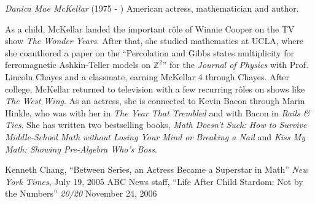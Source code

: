 \documentclass[12pt]{article}
\begin{document}

\emph{Danica Mae McKellar} (1975 - ) American actress, mathematician and author.

As a child, McKellar landed the important r\^ole of Winnie Cooper on the TV show {\it The Wonder Years}. After that, she studied mathematics at UCLA, where she coauthored a paper on the ``Percolation and Gibbs states multiplicity for ferromagnetic Ashkin-Teller models on $\mathbb{Z}^2$'' for the {\it Journal of Physics} with Prof. Lincoln Chayes and a classmate, earning McKellar  4 through Chayes. After college, McKellar returned to television with a few recurring r\^oles on shows like {\it The West Wing}. As an actress, she is connected to Kevin Bacon through Marin Hinkle, who was with her in {\it The Year That Trembled} and with Bacon in {\it Rails \& Ties}. She has written two bestselling books, {\it Math Doesn't Suck: How to Survive Middle-School Math without Losing Your Mind or Breaking a Nail} and {\it Kiss My Math: Showing Pre-Algebra Who's Boss}.

\begin{thebibliography}{2}
 Kenneth Chang, ``Between Series, an Actress Became a Superstar in Math'' {\it New York Times}, July 19, 2005
 ABC News staff, ``Life After Child Stardom: Not by the Numbers'' {\it 20/20} November 24, 2006
\end{thebibliography}
\end{document}
